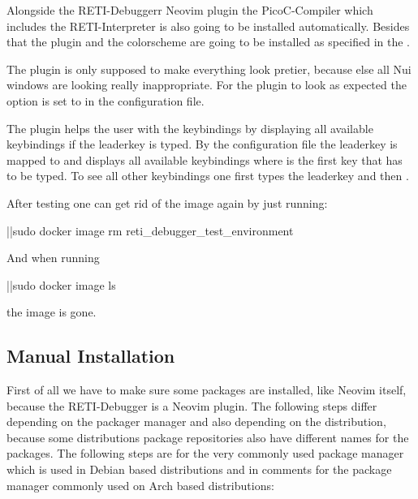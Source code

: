 \documentclass{report}
\begin{document}
Alongside the RETI-Debuggerr Neovim plugin the PicoC-Compiler which includes the \alert{RETI-Interpreter} is also going to be installed automatically. Besides that the  plugin and the colorscheme  are going to be installed as specified in the .

The  plugin is only supposed to make everything look pretier, because else all \alert{Nui} windows are looking really inappropriate. For the  plugin to look as expected the option  is set to  in the configuration file.

The  plugin helps the user with the keybindings by displaying all available keybindings if the \alert{leaderkey} is typed. By the configuration file  the leaderkey is mapped to  and displays all available keybindings where  is the first key that has to be typed. To see all other keybindings one first types the leaderkey  and then \inlinebox{$\leftarrow$}.

After testing one can get rid of the image again by just running:

\begin{terminal}
	|\prompt|sudo docker image rm reti_debugger_test_environment
\end{terminal}

And when running

\begin{terminal}
	|\prompt|sudo docker image ls
\end{terminal}

the image is gone.

\subsection{Manual Installation}
\label{sec:manual installation}

First of all we have to make sure some packages are installed, like Neovim itself, because the RETI-Debugger is a Neovim plugin. The following steps differ depending on the packager manager and also depending on the distribution, because some distributions package repositories also have different names for the packages. The following steps are for the very commonly used package manager  which is used in Debian based distributions and in comments for the  package manager commonly used on Arch based distributions:
\end{document}
